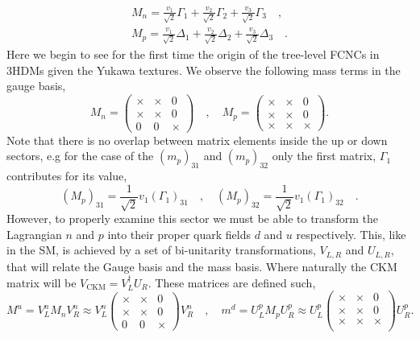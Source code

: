 \documentclass[10pt]{book}
\renewcommand{\(}{\left(}
\renewcommand{\)}{\right)}
\renewcommand{\[}{\left[}
\renewcommand{\]}{\right]}
\begin{document}
% 
\begin{equation}
\label{eq:3HDM_Quark_gauge_mass}
\begin{split}
M_n = \frac{v_1}{\sqrt{2}} \Gamma_1 +  \frac{v_2}{\sqrt{2}} \Gamma_2 +  \frac{v_3}{\sqrt{2}} \Gamma_3  \quad , \\ 
M_p = \frac{v_1}{\sqrt{2}} \Delta_1 +  \frac{v_2}{\sqrt{2}} \Delta_2 +  \frac{v_3}{\sqrt{2}} \Delta_3   \quad .
\end{split}
\end{equation}
%
Here we begin to see for the first time the origin of the tree-level FCNCs in 3HDMs given the Yukawa textures. We observe the following mass terms in the gauge basis, 
%
\begin{equation}
M_n = \begin{pmatrix}
\times & \times & 0 \\
\times & \times & 0 \\
0 & 0 & \times 
\end{pmatrix} 
\quad , \quad 
M_p=\begin{pmatrix}
\times & \times & 0 \\
\times & \times & 0 \\
\times & \times & \times 
\end{pmatrix} .
\end{equation}
%
Note that there is no overlap between matrix elements inside the up or down sectors, e.g for the case of the $(m_p)_{31}$ and $(m_p)_{32}$ only the first matrix, $\Gamma_1$ contributes for its value, 
\begin{equation}
(M_p)_{31} = \frac{1}{\sqrt{2}} v_1 (\Gamma_1)_{31} \quad , \quad (M_p)_{32} = \frac{1}{\sqrt{2}} v_1 (\Gamma_1)_{32} \quad . 
\end{equation}
%
However, to properly examine this sector we must be able to transform the Lagrangian $n$ and $p$ into their proper quark fields $d$ and $u$ respectively. 
%
This, like in the SM, is achieved by a set of bi-unitarity transformations, $V_{L,R}$ and $U_{L,R}$, that will relate the Gauge basis and the mass basis. Where naturally the CKM matrix will be $V_{\text{CKM}} = V_L^\dagger U_R$. These matrices are defined such, 
%
\begin{equation}
M^u = V_L^n M_n V_R^n \approx V_L^n \begin{pmatrix}
\times & \times & 0 \\
\times & \times & 0 \\
0 & 0 & \times 
\end{pmatrix}  V_R^n  \quad , \quad 
m^d = U_L^p  M_p U_R^p \approx U_L^p \begin{pmatrix}
\times & \times & 0 \\
\times & \times & 0 \\
\times & \times & \times \\ \end{pmatrix} U_R^p . 
\end{equation}
\end{document}
